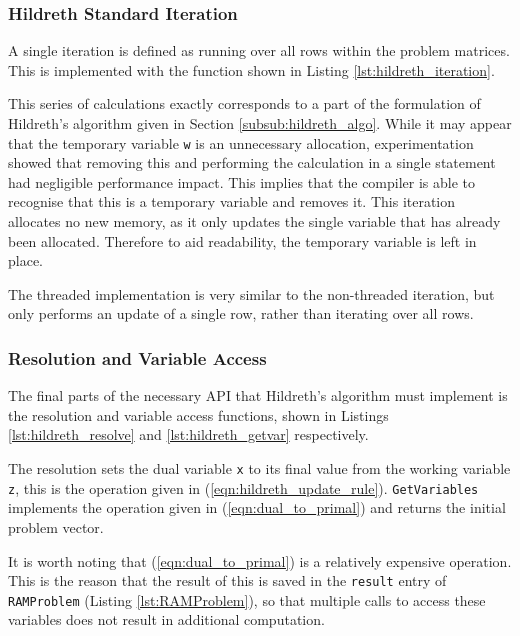 \subsubsection{Hildreth Standard Iteration}
A single iteration is defined as running over all rows within the problem matrices. This is implemented with the function shown in Listing \ref{lst:hildreth_iteration}.



This series of calculations exactly corresponds to a part of the formulation of Hildreth's algorithm given in Section \ref{subsub:hildreth_algo}. While it may appear that the temporary variable \texttt{w} is an unnecessary allocation, experimentation showed that removing this and performing the calculation in a single statement had negligible performance impact. This implies that the compiler is able to recognise that this is a temporary variable and removes it. This iteration allocates no new memory, as it only updates the single variable that has already been allocated.  Therefore to aid readability, the temporary variable is left in place.

The threaded implementation is very similar to the non-threaded iteration, but only performs an update of a single row, rather than iterating over all rows. 

\subsubsection{Resolution and Variable Access}
The final parts of the necessary API that Hildreth's algorithm must implement is the resolution and variable access functions, shown in Listings \ref{lst:hildreth_resolve} and \ref{lst:hildreth_getvar} respectively. 



The resolution sets the dual variable \texttt{x} to its final value from the working variable \texttt{z}, this is the operation given in (\ref{eqn:hildreth_update_rule}). \texttt{GetVariables} implements the operation given in (\ref{eqn:dual_to_primal}) and returns the initial problem vector.



It is worth noting that (\ref{eqn:dual_to_primal}) is a relatively expensive operation. This is the reason that the result of this is saved in the \texttt{result} entry of \texttt{RAMProblem} (Listing \ref{lst:RAMProblem}), so that multiple calls to access these variables does not result in additional computation.